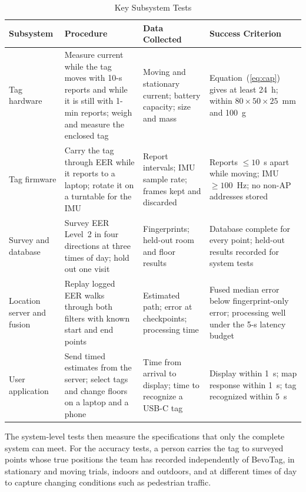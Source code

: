 \documentclass[12pt,letterpaper]{article}
\newenvironment{spectable}{\setstretch{1.0}\renewcommand{\arraystretch}{1.1}}{}
\begin{document}
\begin{table}[!htb]
\caption{Key Subsystem Tests}
\label{tab:subtests}
\centering
\begin{spectable}
\begin{tabularx}{\linewidth}{@{}L{1.0in} Y L{1.25in} L{1.45in}@{}}
\toprule
\textbf{Subsystem} & \textbf{Procedure} & \textbf{Data Collected} & \textbf{Success Criterion} \\
\midrule
Tag hardware & Measure current while the tag moves with 10-s reports and while it is still with 1-min reports; weigh and measure the enclosed tag & Moving and stationary current; battery capacity; size and mass & Equation~(\ref{eq:cap}) gives at least 24~h; within $80\times50\times25$~mm and 100~g \\ \addlinespace
Tag firmware & Carry the tag through EER while it reports to a laptop; rotate it on a turntable for the IMU & Report intervals; IMU sample rate; frames kept and discarded & Reports $\leq 10$~s apart while moving; IMU $\geq 100$~Hz; no non-AP addresses stored \\ \addlinespace
Survey and database & Survey EER Level~2 in four directions at three times of day; hold out one visit & Fingerprints; held-out room and floor results & Database complete for every point; held-out results recorded for system tests \\ \addlinespace
Location server and fusion & Replay logged EER walks through both filters with known start and end points & Estimated path; error at checkpoints; processing time & Fused median error below fingerprint-only error; processing well under the 5-s latency budget \\ \addlinespace
User application & Send timed estimates from the server; select tags and change floors on a laptop and a phone & Time from arrival to display; time to recognize a USB-C tag & Display within 1~s; map response within 1~s; tag recognized within 5~s \\
\bottomrule
\end{tabularx}
\end{spectable}
\end{table}

The system-level tests then measure the specifications that only the complete system can meet. For
the accuracy tests, a person carries the tag to surveyed points whose true positions the team has
recorded independently of BevoTag, in stationary and moving trials, indoors and outdoors, and at
different times of day to capture changing conditions such as pedestrian traffic.
\end{document}
